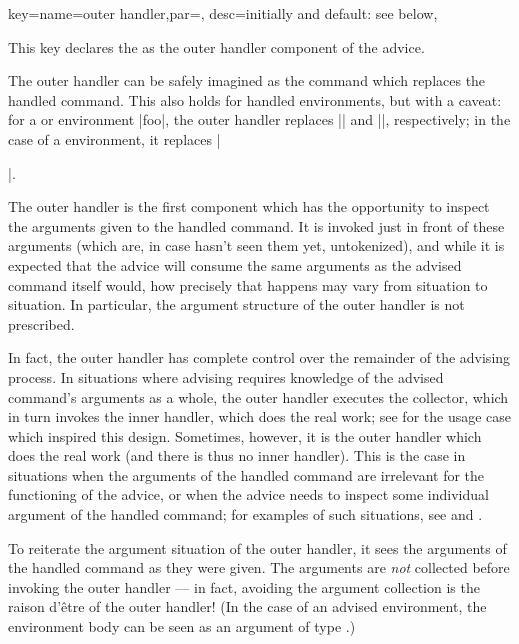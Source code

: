 \documentclass[a4paper,11pt]{article}
\begin{document}
\begin{doc}{
    key={name=outer handler,par=,
      desc=initially and default: see below},
  }

  This key declares the  as the outer handler component
  of the advice.

  The outer handler can be safely imagined as the command which replaces the
  handled command.  This also holds for handled environments, but with a
  caveat: for a  or  environment |foo|, the
  outer handler replaces |\foo| and |\startfoo|, respectively; in the case of a
   environment, it replaces |\begin{foo}|.%
  
  The outer handler is the first component which has the opportunity to inspect
  the arguments given to the handled command.  It is invoked just in front of
  these arguments (which are, in case  hasn't seen them yet,
  untokenized), and while it is expected that the advice will consume
  the same arguments as the advised command itself would, how precisely that
  happens may vary from situation to situation.  In particular, the argument
  structure of the outer handler is not prescribed.
  
  In fact, the outer handler has complete control over the remainder of the
  advising process.  In situations where advising requires knowledge of the
  advised command's arguments as a whole, the outer handler executes the
  collector, which in turn invokes the inner handler, which does the real work;
  see  for the usage case which inspired this design.
  Sometimes, however, it is the outer handler which does the real work (and
  there is thus no inner handler).  This is the case in situations when the
  arguments of the handled command are irrelevant for the functioning of the
  advice, or when the advice needs to inspect some individual argument of the
  handled command; for examples of such situations, see  and
  .

  To reiterate the argument situation of the outer handler, it sees the
  arguments of the handled command as they were given.  The arguments are
  \emph{not} collected before invoking the outer handler --- in fact, avoiding
  the argument collection is the raison d'être of the outer handler!  (In the case
  of an advised environment, the environment body can be seen as an argument of
   type .)
  

\end{foo}
\end{doc}
\end{document}
